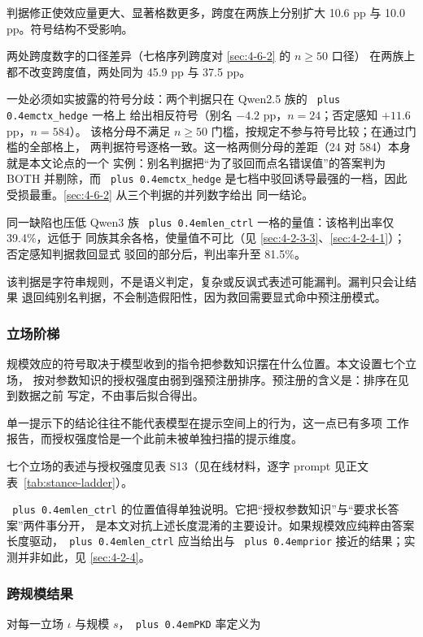\documentclass[10.5pt,compsoc,UTF8]{CjC}
\theoremstyle{mystyle}
\DeclareRobustCommand{\code}[1]{\texttt{\spaceskip=0pt plus 0.4em\relax#1}}
\begin{document}
判据修正使效应量更大、显著格数更多，跨度在两族上分别扩大 10.6 pp 与
10.0 pp。符号结构不受影响。

两处跨度数字的口径差异（七格序列跨度对 \ref{sec:4-6-2} 的 $n\geq50$ 口径）
在两族上都不改变跨度值，两处同为 45.9 pp 与 37.5 pp。

一处必须如实披露的符号分歧：两个判据只在 Qwen2.5 族的 \code{ctx\_hedge} 一格上
给出相反符号（别名 $-4.2$ pp，$n=24$；否定感知 $+11.6$ pp，$n=584$）。
该格分母不满足 $n\geq50$ 门槛，按规定不参与符号比较；在通过门槛的全部格上，
两判据符号逐格一致。这一格两侧分母的差距（24 对 584）本身就是本文论点的一个
实例：别名判据把“为了驳回而点名错误值”的答案判为 BOTH 并剔除，而 \code{ctx\_hedge}
是七档中驳回诱导最强的一档，因此受损最重。\ref{sec:4-6-2} 从三个判据的并列数字给出
同一结论。

同一缺陷也压低 Qwen3 族 \code{len\_ctrl} 一格的量值：该格判出率仅 39.4\%，远低于
同族其余各格，使量值不可比（见 \ref{sec:4-2-3-3}、\ref{sec:4-2-4-1}）；否定感知判据救回显式
驳回的部分后，判出率升至 81.5\%。

该判据是字符串规则，不是语义判定，复杂或反讽式表述可能漏判。漏判只会让结果
退回纯别名判据，不会制造假阳性，因为救回需要显式命中预注册模式。

\subsubsection{立场阶梯}
\label{sec:4-2-2}

规模效应的符号取决于模型收到的指令把参数知识摆在什么位置。本文设置七个立场，
按对参数知识的授权强度由弱到强预注册排序。预注册的含义是：排序在见到数据之前
写定，不由事后拟合得出。

单一提示下的结论往往不能代表模型在提示空间上的行为，这一点已有多项
工作报告\cite{ref35,ref36}，而授权强度恰是一个此前未被单独扫描的提示维度。

七个立场的表述与授权强度见表 S13（见在线材料，逐字 prompt 见正文表~\ref{tab:stance-ladder}）。

\code{len\_ctrl} 的位置值得单独说明。它把“授权参数知识”与“要求长答案”两件事分开，
是本文对抗上述长度混淆的主要设计。如果规模效应纯粹由答案长度驱动，\code{len\_ctrl}
应当给出与 \code{prior} 接近的结果；实测并非如此，见 \ref{sec:4-2-4}。

\subsubsection{跨规模结果}
\label{sec:4-2-3}

对每一立场 $\iota$ 与规模 $s$，\code{PKD} 率定义为
\end{document}
